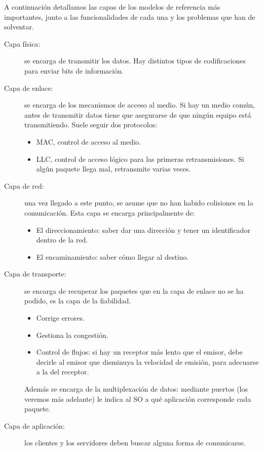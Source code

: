 A continuación detallamos las capas de los modelos de referencia más importantes, junto a las funcionalidades de cada una y los problemas que han de solventar.
\begin{description}
    \item [Capa física:] se encarga de transmitir los datos. Hay distintos tipos de codificaciones para enviar bits de información.
    \item [Capa de enlace:] se encarga de los mecanismos de acceso al medio. Si hay un medio común, antes de transmitir datos tiene que asegurarse de que ningún equipo está transmitiendo. Suele seguir dos protocolos: 
        \begin{itemize}
            \item \acrfull{MAC}, control de acceso al medio.
            \item \acrfull{LLC}, control de acceso lógico para las primeras retransmisiones. Si algún paquete llega mal, retransmite varias veces. 
        \end{itemize}
    
    \item [Capa de red:] una vez llegado a este punto, se asume que no han habido colisiones en la comunicación. Esta capa se encarga principalmente de: 
        \begin{itemize}
            \item El direccionamiento: saber dar una dirección y tener un identificador dentro de la red. 
            \item El encaminamiento: saber cómo llegar al destino. 
        \end{itemize}

    \item [Capa de transporte:] se encarga de recuperar los paquetes que en la capa de enlace no se ha podido, es la capa de la fiabilidad. 
        \begin{itemize}
            \item Corrige errores.
            \item Gestiona la congestión. 
            \item Control de flujos: si hay un receptor más lento que el emisor, debe decirle al emisor que disminuya la velocidad de emisión, para adecuarse a la del receptor. 
        \end{itemize}
    Además se encarga de la multiplexación de datos: mediante puertos (los veremos más adelante) le indica al SO a qué aplicación corresponde cada paquete. 
    \item [Capa de aplicación:] los clientes y los servidores deben buscar alguna forma de comunicarse. 
\end{description}

